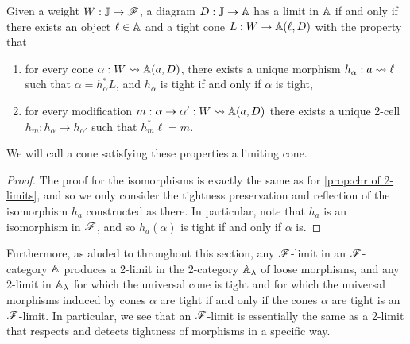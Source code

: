 \documentclass[../thesis.tex]{subfiles}
\begin{document}
\begin{proposition}\label{prop:chr of F-limits}
  Given a weight $W : {\mathbb{J}} \to {\mathscr{F}}$, a diagram $D : {\mathbb{J}} \to {\mathbb{A}}$ has a limit in ${\mathbb{A}}$ if and only if there
  exists an object $\ell \in {\mathbb{A}}$ and a tight cone $L : W \to {\mathbb{A}}(\ell,D)$ with the property that
  \begin{enumerate}
    \item for every cone $\alpha : W \rightsquigarrow {\mathbb{A}}(a,D)$, there exists a unique morphism $h_\alpha : a \rightsquigarrow
      \ell$ such that $\alpha = h_\alpha^*L$, and $h_\alpha$ is tight if and only if $\alpha$ is tight,
    \item for every modification $m : \alpha \to \alpha' : W \rightsquigarrow {\mathbb{A}}(a,D)$ there exists a unique 2-cell
      $h_m : h_\alpha \to h_{\alpha'}$ such that $h_m^*\ell = m$.
  \end{enumerate}
  We will call a cone satisfying these properties a limiting cone.
\end{proposition}
\begin{proof}
  The proof for the isomorphisms is exactly the same as for \cref{prop:chr of 2-limits}, and so we only consider
  the tightness preservation and reflection of the isomorphism $h_a$ constructed as there. In particular, note
  that $h_a$ is an isomorphism in ${\mathscr{F}}$, and so $h_a(\alpha)$ is tight if and only if $\alpha$ is.
\end{proof}
Furthermore, as aluded to throughout this section, any ${\mathscr{F}}$-limit in an ${\mathscr{F}}$-category ${\mathbb{A}}$ produces a 2-limit in
the 2-category ${\mathbb{A}}_\lambda$ of loose morphisms, and any 2-limit in ${\mathbb{A}}_\lambda$ for which the universal cone is
tight and for which the universal morphisms induced by cones $\alpha$ are tight if and only if the cones $\alpha$
are tight is an ${\mathscr{F}}$-limit. In particular, we see that an ${\mathscr{F}}$-limit is essentially the same as a 2-limit that
respects and detects tightness of morphisms in a specific way. 
\end{document}
